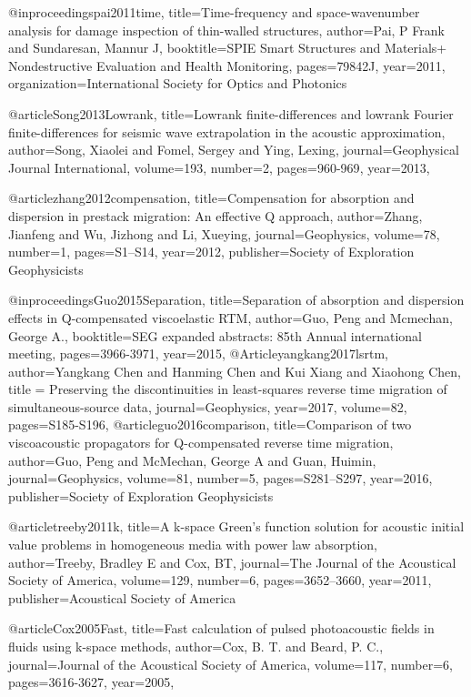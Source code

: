 @inproceedings{pai2011time,
  title={Time-frequency and space-wavenumber analysis for damage inspection of thin-walled structures},
  author={Pai, P Frank and Sundaresan, Mannur J},
  booktitle={SPIE Smart Structures and Materials+ Nondestructive Evaluation and Health Monitoring},
  pages={79842J},
  year={2011},
  organization={International Society for Optics and Photonics}
}


@article{Song2013Lowrank,
  title={Lowrank finite-differences and lowrank {F}ourier finite-differences for seismic wave extrapolation in the acoustic approximation},
  author={Song, Xiaolei and Fomel, Sergey and Ying, Lexing},
  journal={Geophysical Journal International},
  volume={193},
  number={2},
  pages={960-969},
  year={2013},
}

@article{zhang2012compensation,
  title={Compensation for absorption and dispersion in prestack migration: {A}n effective {Q} approach},
  author={Zhang, Jianfeng and Wu, Jizhong and Li, Xueying},
  journal={Geophysics},
  volume={78},
  number={1},
  pages={S1--S14},
  year={2012},
  publisher={Society of Exploration Geophysicists}
}

@inproceedings{Guo2015Separation,
  title={Separation of absorption and dispersion effects in {Q}-compensated viscoelastic {RTM}},
  author={Guo, Peng and Mcmechan, George A.},
  booktitle={SEG expanded abstracts: 85th Annual international meeting},
  pages={3966-3971},
  year={2015},
}
@Article{yangkang2017lsrtm,
  author={Yangkang Chen and Hanming Chen and Kui Xiang and Xiaohong Chen},
  title = {Preserving the discontinuities in least-squares reverse time migration of simultaneous-source data},
  journal={Geophysics},
  year=2017,
  volume=82,
  pages={S185-S196},
}
@article{guo2016comparison,
  title={Comparison of two viscoacoustic propagators for {Q}-compensated reverse time migration},
  author={Guo, Peng and McMechan, George A and Guan, Huimin},
  journal={Geophysics},
  volume={81},
  number={5},
  pages={S281--S297},
  year={2016},
  publisher={Society of Exploration Geophysicists}
}


@article{treeby2011k,
  title={A k-space Green's function solution for acoustic initial value problems in homogeneous media with power law absorption},
  author={Treeby, Bradley E and Cox, BT},
  journal={The Journal of the Acoustical Society of America},
  volume={129},
  number={6},
  pages={3652--3660},
  year={2011},
  publisher={Acoustical Society of America}
}

@article{Cox2005Fast,
  title={Fast calculation of pulsed photoacoustic fields in fluids using k-space methods},
  author={Cox, B. T. and Beard, P. C.},
  journal={Journal of the Acoustical Society of America},
  volume={117},
  number={6},
  pages={3616-3627},
  year={2005},
}

